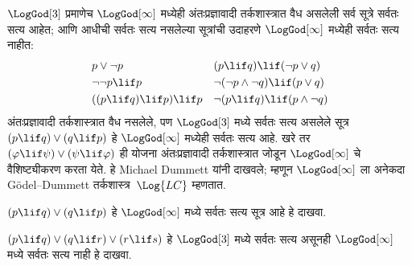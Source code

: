 $\LogGod[3]$ प्रमाणेच $\LogGod[\infty]$ मध्येही
अंतःप्रज्ञावादी तर्कशास्त्रात वैध असलेली सर्व सूत्रे
सर्वतः सत्य आहेत; आणि आधीची सर्वतः सत्य नसलेल्या सूत्रांची
उदाहरणे $\LogGod[\infty]$ मध्येही सर्वतः सत्य नाहीत:
\begin{align*}
  & p \lor \lnot p && (p \lif q) \lif (\lnot p \lor q) \\
  & \lnot\lnot p \lif p && \lnot(\lnot p \land \lnot q) \lif (p \lor q) \\
  & ((p \lif q) \lif p) \lif p && \lnot(p \lif q) \lif (p \land \lnot q)
\end{align*}
अंतःप्रज्ञावादी तर्कशास्त्रात वैध नसलेले, पण
$\LogGod[3]$ मध्ये सर्वतः सत्य असलेले
सूत्र~$(p \lif q) \lor (q \lif p)$ हे
$\LogGod[\infty]$ मध्येही सर्वतः सत्य आहे. खरे तर
$(\varphi \lif \psi) \lor (\psi \lif \varphi)$ ही योजना
अंतःप्रज्ञावादी तर्कशास्त्रात जोडून $\LogGod[\infty]$
चे वैशिष्ट्यीकरण करता येते. हे Michael Dummett यांनी
दाखवले; म्हणून $\LogGod[\infty]$ ला अनेकदा
G\"odel--Dummett तर्कशास्त्र~$\Log{LC}$ म्हणतात.
\begin{prob}
  $(p \lif q) \lor (q \lif p)$ हे $\LogGod[\infty]$
  मध्ये सर्वतः सत्य सूत्र आहे हे दाखवा.
\end{prob}
\begin{prob}
  $(p \lif q) \lor (q \lif r) \lor (r \lif s)$ हे
  $\LogGod[3]$ मध्ये सर्वतः सत्य असूनही
  $\LogGod[\infty]$ मध्ये सर्वतः सत्य नाही हे दाखवा.
\end{prob}
